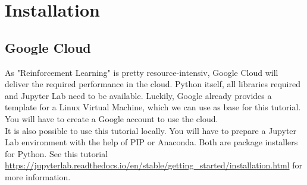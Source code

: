\documentclass[a4paper]{article}
\begin{document}
\section{Installation}
\subsection{Google Cloud}
As "Reinforcement Learning" is pretty resource-intensiv, Google Cloud will deliver the required performance in the cloud. Python itself, all libraries required and Jupyter Lab need to be available. Luckily, Google already provides a template for a Linux Virtual Machine, which we can use as base for this tutorial. You will have to create a Google account to use the cloud.\\
It is also possible to use this tutorial locally. You will have to prepare a Jupyter Lab environment with the help of PIP or Anaconda. Both are package installers for Python. See this tutorial \url{https://jupyterlab.readthedocs.io/en/stable/getting_started/installation.html} for more information.
\end{document}
